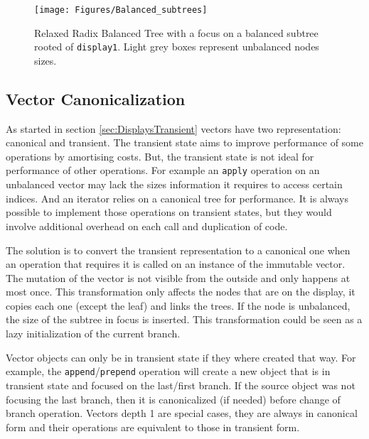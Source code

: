 \begin{figure}[h!]
  \centering
  \texttt{[image: Figures/Balanced\_subtrees]}
  \caption{Relaxed Radix Balanced Tree with a focus on a balanced subtree rooted of \texttt{display1}. Light grey boxes represent unbalanced nodes sizes.}
  \label{Balanced_subtrees}
\end{figure}


\subsection{Vector Canonicalization}
\label{VectorCanonicalization}
As started in section \ref{sec:DisplaysTransient} vectors have two representation: canonical and transient. The transient state aims to improve performance of some operations by amortising costs. But, the transient state is not ideal for performance of other operations. For example an \texttt{apply} operation on an unbalanced vector may lack the sizes information it requires to access certain indices. And an iterator relies on a canonical tree for performance. It is always possible to implement those operations on transient states, but they would involve additional overhead on each call and duplication of code.

The solution is to convert the transient representation to a canonical one when an operation that requires it is called on an instance of the immutable vector. The mutation of the vector is not visible from the outside and only happens at most once. This transformation only affects the nodes that are on the display, it copies each one (except the leaf) and links the trees. If the node is unbalanced, the size of the subtree in focus is inserted. This transformation could be seen as a lazy initialization of the current branch.

Vector objects can only be in transient state if they where created that way. For example, the \texttt{append}/\texttt{prepend} operation will create a new object that is in transient state and focused on the last/first branch. If the source object was not focusing the last branch, then it is canonicalized (if needed) before change of branch operation. Vectors depth 1 are special cases, they are always in canonical form and their operations are equivalent to those in transient form.

